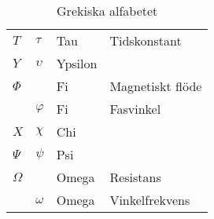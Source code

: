 \begin{table*}
\begin{center}
\begin{tabular}{ll|l|l}
    \(T\) & \(\tau\) & Tau & Tidskonstant \\
    \(Y\) & \(\upsilon\) & Ypsilon &  \\
    \(\Phi\) & & Fi & Magnetiskt flöde \\
    & \(\varphi\) & Fi & Fasvinkel \\
    \(X\) & \(\chi\) & Chi & \\
    \(\Psi\) & \(\psi\) & Psi & \\
    \(\Omega\) & & Omega & Resistans \\
    & \(\omega\) & Omega & Vinkelfrekvens \\
  \end{tabular}
  \caption{Grekiska alfabetet}
  \label{tab:a.grekiska}
  \end{center}
\end{table*}
